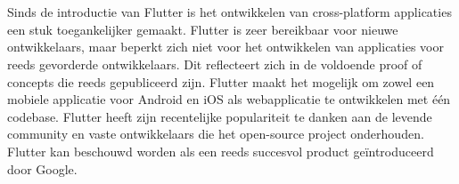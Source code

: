 
\chapter{}
\label{ch:inleiding}

Sinds de introductie van Flutter is het ontwikkelen van cross-platform applicaties een stuk toegankelijker gemaakt. Flutter is zeer bereikbaar voor nieuwe ontwikkelaars, maar beperkt zich niet voor het ontwikkelen van applicaties voor reeds gevorderde ontwikkelaars. Dit reflecteert zich in de voldoende proof of concepts die reeds gepubliceerd zijn. Flutter maakt het mogelijk om zowel een mobiele applicatie voor Android en iOS als webapplicatie te ontwikkelen met één codebase. Flutter heeft zijn recentelijke populariteit te danken aan de levende community en vaste ontwikkelaars die het open-source project onderhouden. Flutter kan beschouwd worden als een reeds succesvol product geïntroduceerd door Google.
\newline



\section{}
\label{sec:probleemstelling}

